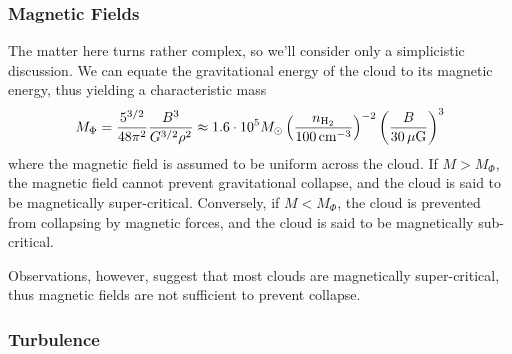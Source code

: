 \subsubsection*{Magnetic Fields}

The matter here turns rather complex, so we'll consider only a simplicistic discussion. We can equate the gravitational energy of the cloud to its magnetic energy, thus yielding a characteristic mass
\begin{equation*}
    M_{\Phi} = \frac{5^{3/2}}{48\pi^{2}}\frac{B^{3}}{G^{3/2}\rho^{2}} \approx 1.6\cdot 10^{5}M_{\odot}\left(\frac{n_{\text{H}_{2}}}{100\,\text{cm}^{-3}}\right)^{-2}\left(\frac{B}{30\,\mu\text{G}}\right)^{3}
\end{equation*}
where the magnetic field is assumed to be uniform across the cloud. If $M > M_{\Phi}$,  the magnetic field cannot prevent gravitational collapse, and the cloud is said to be magnetically super-critical. Conversely, if $M < M_{\Phi}$, the cloud is prevented from collapsing by magnetic forces, and the cloud is said to be magnetically sub-critical.
\par Observations, however, suggest that most clouds are magnetically super-critical, thus magnetic fields are not sufficient to prevent collapse.

\subsubsection*{Turbulence}


